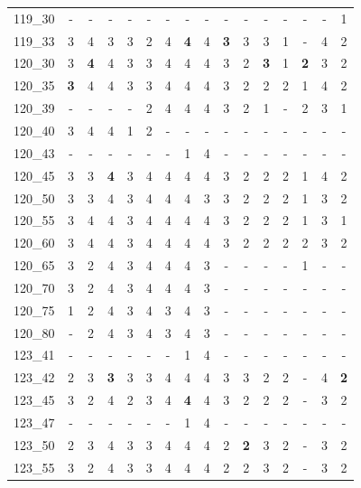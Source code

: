 {\begin{longtable}{lccccccccccccccc}
119\_30 & - & - & - & - & - & - & - & - & - & - & - & - & - & - & 1 \\
119\_33 & 3 & 4 & 3 & 3 & 2 & 4 & \cellcolor{green!20}\textbf{4} & 4 & \cellcolor{green!20}\textbf{3} & 3 & 3 & 1 & - & 4 & 2 \\
120\_30 & 3 & \cellcolor{green!20}\textbf{4} & 4 & 3 & 3 & 4 & 4 & 4 & 3 & 2 & \cellcolor{green!20}\textbf{3} & 1 & \cellcolor{green!20}\textbf{2} & 3 & 2 \\
120\_35 & \cellcolor{green!20}\textbf{3} & 4 & 4 & 3 & 3 & 4 & 4 & 4 & 3 & 2 & 2 & 2 & 1 & 4 & 2 \\
120\_39 & - & - & - & - & 2 & 4 & 4 & 4 & 3 & 2 & 1 & - & 2 & 3 & 1 \\
120\_40 & 3 & 4 & 4 & 1 & 2 & - & - & - & - & - & - & - & - & - & - \\
120\_43 & - & - & - & - & - & - & 1 & 4 & - & - & - & - & - & - & - \\
120\_45 & 3 & 3 & \cellcolor{green!20}\textbf{4} & 3 & 4 & 4 & 4 & 4 & 3 & 2 & 2 & 2 & 1 & 4 & 2 \\
120\_50 & 3 & 3 & 4 & 3 & 4 & 4 & 4 & 3 & 3 & 2 & 2 & 2 & 1 & 3 & 2 \\
120\_55 & 3 & 4 & 4 & 3 & 4 & 4 & 4 & 4 & 3 & 2 & 2 & 2 & 1 & 3 & 1 \\
120\_60 & 3 & 4 & 4 & 3 & 4 & 4 & 4 & 4 & 3 & 2 & 2 & 2 & 2 & 3 & 2 \\
120\_65 & 3 & 2 & 4 & 3 & 4 & 4 & 4 & 3 & - & - & - & - & 1 & - & - \\
120\_70 & 3 & 2 & 4 & 3 & 4 & 4 & 4 & 3 & - & - & - & - & - & - & - \\
120\_75 & 1 & 2 & 4 & 3 & 4 & 3 & 4 & 3 & - & - & - & - & - & - & - \\
120\_80 & - & 2 & 4 & 3 & 4 & 3 & 4 & 3 & - & - & - & - & - & - & - \\
123\_41 & - & - & - & - & - & - & 1 & 4 & - & - & - & - & - & - & - \\
123\_42 & 2 & 3 & \cellcolor{green!20}\textbf{3} & 3 & 3 & 4 & 4 & 4 & 3 & 3 & 2 & 2 & - & 4 & \cellcolor{green!20}\textbf{2} \\
123\_45 & 3 & 2 & 4 & 2 & 3 & 4 & \cellcolor{green!20}\textbf{4} & 4 & 3 & 2 & 2 & 2 & - & 3 & 2 \\
123\_47 & - & - & - & - & - & - & 1 & 4 & - & - & - & - & - & - & - \\
123\_50 & 2 & 3 & 4 & 3 & 3 & 4 & 4 & 4 & 2 & \cellcolor{green!20}\textbf{2} & 3 & 2 & - & 3 & 2 \\
123\_55 & 3 & 2 & 4 & 3 & 3 & 4 & 4 & 4 & 2 & 2 & 3 & 2 & - & 3 & 2 \\

\end{longtable}}

